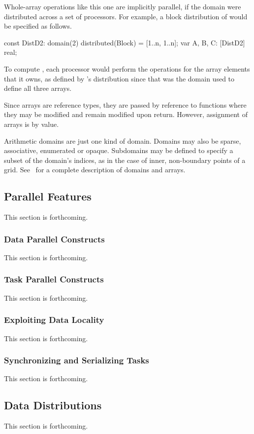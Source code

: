 Whole-array operations like this one are implicitly parallel, if the 
domain were distributed across a set of processors.  For example, 
a block distribution of  would be specified as follows.    
\begin{chapel}
const DistD2: domain(2) distributed(Block) = [1..n, 1..n];
var A, B, C: [DistD2] real;
\end{chapel}
To compute , each processor would perform the 
operations for the array elements that it owns, 
as defined by 's distribution since that was the domain
used to define all three arrays.

Since arrays are reference types, they are passed by reference to functions
where they may be modified and remain modified upon return.  However, assignment
of arrays is by value.

Arithmetic domains are just one kind of domain.  Domains may
also be sparse, associative, enumerated or opaque.  Subdomains may be
defined to specify a subset of the domain's indices, as in the case of
inner, non-boundary points of a grid.  See~ for
a complete description of domains and arrays.
 
\subsection{Parallel Features}
\label{Parallel_Features}

This section is forthcoming.


\subsubsection{Data Parallel Constructs}
\label{Data_Parallel_Constructs}

This section is forthcoming.


\subsubsection{Task Parallel Constructs}
\label{Task_Parallel_Constructs}

This section is forthcoming.


\subsubsection{Exploiting Data Locality}
\label{Exploiting_Data_Locality}

This section is forthcoming.


\subsubsection{Synchronizing and Serializing Tasks}
\label{Synchronizing_and_Serializing_Tasks}

This section is forthcoming.


\subsection{Data Distributions}
\label{Data_Distributions}

This section is forthcoming.


